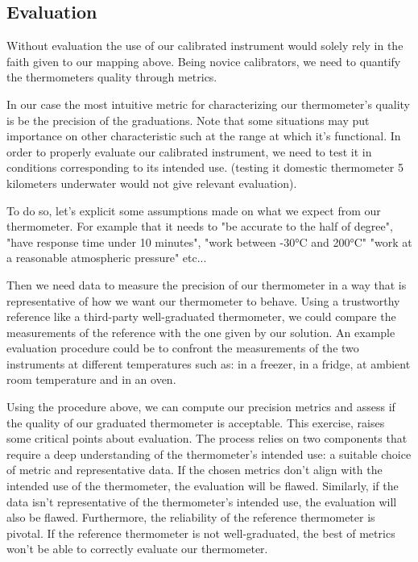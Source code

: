 \begin{bibunit}
\subsection{Evaluation}

Without evaluation the use of our calibrated instrument would solely rely in the faith given to our mapping above.
Being novice calibrators, we need to quantify the thermometers quality through metrics.

In our case the most intuitive metric for characterizing our thermometer's quality is be the precision of the graduations.
Note that some situations may put importance on other characteristic such at the range at which it's functional.
  In order to properly evaluate our calibrated instrument, we need to test it in conditions corresponding to its intended use. (testing it domestic thermometer 5 kilometers underwater would not give relevant evaluation).

 To do so, let's explicit some assumptions made on what we expect from our thermometer.
  For example that it needs to "be accurate to the half of degree", "have response time under 10 minutes", "work between -30°C and 200°C" "work at a reasonable atmospheric pressure" etc...

Then we need data to measure the precision of our thermometer in a way that is representative of how we want our thermometer to behave. Using a trustworthy reference like a third-party well-graduated thermometer, we could compare the measurements of the reference with the one given by our solution.
  An example evaluation procedure could be to confront the measurements of the two instruments at different temperatures such as: in a freezer, in a fridge, at ambient room temperature and in an oven.

Using the procedure above, we can compute our precision metrics and assess if the quality of our graduated thermometer is acceptable.
This exercise, raises some critical points about evaluation. The process relies on two components that require a deep understanding of the thermometer's intended use: a suitable choice of metric and representative data. If the chosen metrics don't align with the intended use of the thermometer, the evaluation will be flawed. Similarly, if the data isn't representative of the thermometer's intended use, the evaluation will also be flawed.
 Furthermore, the reliability of the reference thermometer is pivotal. If the reference thermometer is not well-graduated, the best of metrics won't be able to correctly evaluate our thermometer. 


\end{bibunit}
